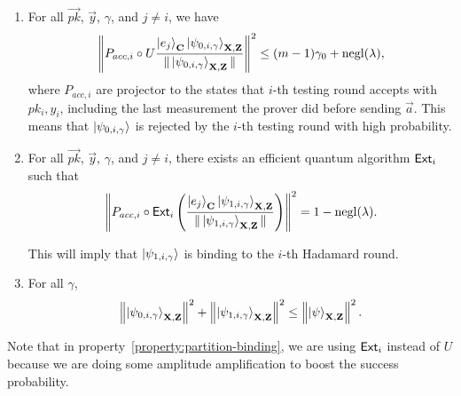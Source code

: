 \begin{lemma}
\begin{enumerate}
		\item \label{property:partition-testing}
			For all $\vec{pk}$, $\vec{y}$, $\gamma$, and  $j\neq i$, we have
			\begin{align}
				\left\lVert P_{acc, i} \circ U\frac{\ket{e_j}_{\mathbf{C}}\ket{\psi_{0,i,\gamma}}_{\mathbf{X},\mathbf{Z}}}{\|\ket{\psi_{0,i,\gamma}}_{\mathbf{X},\mathbf{Z}}\|}\right\rVert^2 \leq (m-1)\gamma_0+\operatorname{negl}(\lambda),
			\end{align}
			where $P_{acc, i}$ are projector to the states that $i$-th testing round accepts with $pk_i,y_i$, including the last measurement the prover did before sending $\vec{a}$.  This means that $\ket{\psi_{0,i,\gamma}}$ is rejected by the $i$-th testing round with high probability.
		\item \label{property:partition-binding}
			For all $\vec{pk}$, $\vec{y}$, $\gamma$, and $j\neq i$, there exists an efficient quantum algorithm $\mathsf{Ext}_i$ such that
			\begin{align}
				\left\lVert P_{acc, i} \circ \mathsf{Ext}_i\left(\frac{\ket{e_j}_{\mathbf{C}}\ket{\psi_{1,i,\gamma}}_{\mathbf{X},\mathbf{Z}}}{\|\ket{\psi_{1,i,\gamma}}_{\mathbf{X},\mathbf{Z}}\|}\right)\right\rVert^2 =1-\operatorname{negl}(\lambda).
			\end{align}

			This will imply that $\ket{\psi_{1,i,\gamma}}$ is binding to the $i$-th Hadamard round.

		\item \label{property-partition-norm-sum}
			For all $\gamma$,
			\begin{align}
				\left\lVert\ket{\psi_{0,i,\gamma}}_{\mathbf{X},\mathbf{Z}}\right\rVert^2+ \left\lVert\ket{\psi_{1,i,\gamma}}_{\mathbf{X},\mathbf{Z}}\right\rVert^2 \leq  \left\lVert\ket{\psi}_{\mathbf{X},\mathbf{Z}}\right\rVert^2.
			\end{align}
	\end{enumerate}
\end{lemma}

Note that in property~\ref{property:partition-binding}, we are using $\mathsf{Ext}_i$ instead of $U$ because we are doing some amplitude amplification to boost the success probability. 






